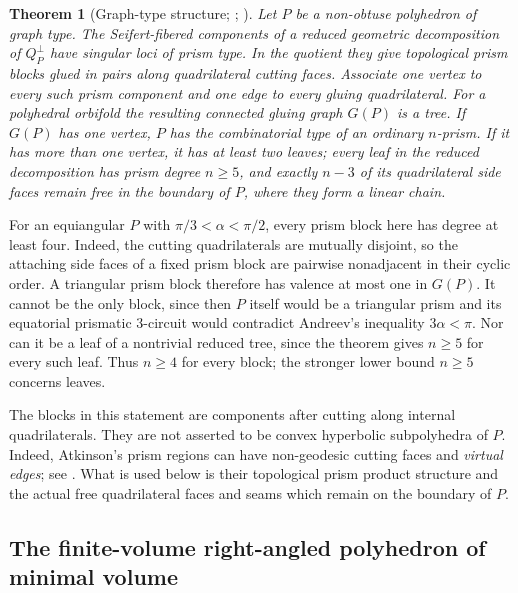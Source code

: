 \documentclass[12pt,a4paper]{article}
\newtheorem{theorem}{Theorem}[section]
\theoremstyle{definition}
\begin{document}
\begin{theorem}[Graph-type structure; {\cite[Sections~4.2 and 6.4]{Atkinson2011};
\cite[Section~3, proof of Lemma~3.5]{AtkinsonRafalski}}]\label{thm:graph-type-structure}
Let \(P\) be a non-obtuse polyhedron of graph type.  The Seifert-fibered
components of a reduced geometric decomposition of \(Q_P^\perp\) have
singular loci of prism type.  In the quotient they give topological prism
blocks glued in pairs along quadrilateral cutting faces.  Associate one vertex
to every such prism component and one edge to every gluing quadrilateral.  For
a polyhedral orbifold the resulting connected gluing graph \(G(P)\) is a tree.
If \(G(P)\) has one vertex, \(P\) has the combinatorial type of an ordinary
\(n\)-prism.  If it has more than one vertex, it has at least two leaves; every
leaf in the reduced decomposition has prism degree \(n\ge5\), and exactly
\(n-3\) of its quadrilateral side faces remain free in the boundary of \(P\),
where they form a linear chain.
\end{theorem}

For an equiangular \(P\) with \(\pi/3<\alpha<\pi/2\), every prism block
here has degree at least four. Indeed, the cutting
quadrilaterals are mutually disjoint, so the attaching side faces of a fixed
prism block are pairwise nonadjacent in their cyclic order.  A triangular
prism block therefore has valence at most one in \(G(P)\).  It cannot be the
only block, since then \(P\) itself would be a triangular prism and its
equatorial prismatic \(3\)-circuit would contradict Andreev's inequality
\(3\alpha<\pi\).  Nor can it be a leaf of a nontrivial reduced tree, since
the theorem gives \(n\ge5\) for every such leaf.  Thus \(n\ge4\) for every
block; the stronger lower bound \(n\ge5\) concerns leaves.

The blocks in this statement are components after cutting along internal
quadrilaterals.  They are not asserted to be convex hyperbolic subpolyhedra of
\(P\).  Indeed, Atkinson's prism regions can have non-geodesic cutting faces
and \emph{virtual edges}; see \cite[Section~6.4]{Atkinson2011}.  What is used
below is their topological prism product structure and the actual free
quadrilateral faces and seams which remain on the boundary of \(P\).

\subsection{The finite-volume right-angled polyhedron of minimal volume}
\end{document}

